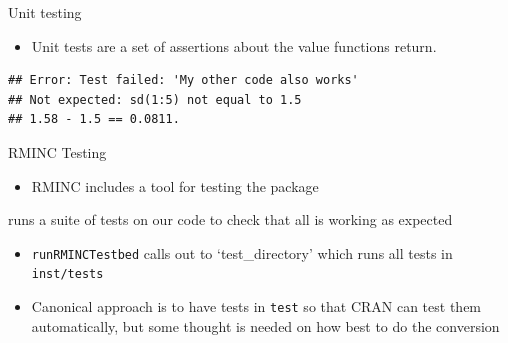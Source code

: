 \begin{frame}[fragile]{Unit testing}

\begin{itemize}
\tightlist
\item
  Unit tests are a set of assertions about the value functions return.
\end{itemize}

\begin{Shaded}
\begin{Highlighting}[]
\NormalTok{(}\NormalTok{,}
           \NormalTok{(}\NormalTok{(}\NormalTok{:}\NormalTok{), }\NormalTok{))}

\NormalTok{(}\NormalTok{,}
         \NormalTok{(}\NormalTok{(}\NormalTok{:}\NormalTok{), }\NormalTok{))}
\end{Highlighting}
\end{Shaded}

\begin{verbatim}
## Error: Test failed: 'My other code also works'
## Not expected: sd(1:5) not equal to 1.5
## 1.58 - 1.5 == 0.0811.
\end{verbatim}

\end{frame}

\begin{frame}[fragile]{RMINC Testing}

\begin{itemize}
\tightlist
\item
  RMINC includes a tool for testing the package
\end{itemize}

\begin{Shaded}
\begin{Highlighting}[]
\NormalTok{()}
\end{Highlighting}
\end{Shaded}

runs a suite of tests on our code to check that all is working as
expected

\begin{itemize}
\tightlist
\item
  \texttt{runRMINCTestbed} calls out to `test\_directory' which runs all
  tests in \texttt{inst/tests}
\item
  Canonical approach is to have tests in \texttt{test} so that CRAN can
  test them automatically, but some thought is needed on how best to do
  the conversion
\end{itemize}

\end{frame}

